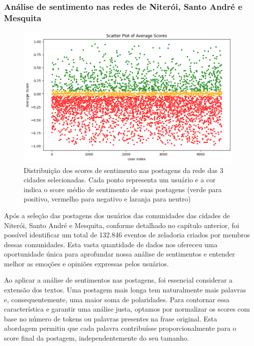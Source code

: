 \subsubsection*{Análise de sentimento nas redes de Niterói, Santo André e Mesquita}

\begin{figure}[!htb]
	\caption{Distribuição dos scores de sentimento nas postagens da rede das 3 cidades selecionadas. Cada ponto representa um usuário e a cor indica o score médio de sentimento de suas postagens (verde para positivo, vermelho para negativo e laranja para neutro)}
	\label{fig:scores_scatterplot}
	\centering
	\includegraphics[scale=0.70]{images/scores_scatterplot.png}
	\fautor
\end{figure}

Após a seleção das postagens dos usuários das comunidades das cidades de Niterói, Santo André e Mesquita, conforme detalhado no capítulo anterior, foi possível identificar um total de 132.846 eventos de zeladoria criados por membros dessas comunidades. Esta vasta quantidade de dados nos ofereceu uma oportunidade única para aprofundar nossa análise de sentimentos e entender melhor as emoções e opiniões expressas pelos usuários.

Ao aplicar a análise de sentimentos nas postagens, foi essencial considerar a extensão dos textos. Uma postagem mais longa tem naturalmente mais palavras e, consequentemente, uma maior soma de polaridades. Para contornar essa característica e garantir uma análise justa, optamos por normalizar os scores com base no número de tokens ou palavras presentes na frase original. Esta abordagem permitiu que cada palavra contribuísse proporcionalmente para o score final da postagem, independentemente do seu tamanho.

